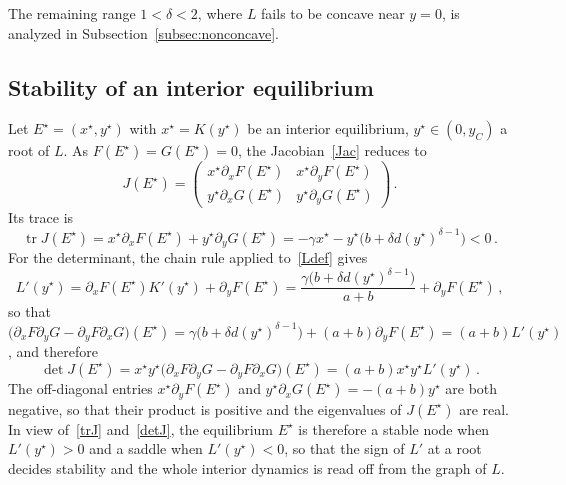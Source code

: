 \documentclass[reqno,11pt]{amsart}
\numberwithin{equation}{section}
\begin{document}
The remaining range $1<\delta<2$, where $L$ fails to be concave near $y=0$, is analyzed in Subsection~\ref{subsec:nonconcave}.

\smallskip

\subsection{Stability of an interior equilibrium}\label{subsec:int-stab}

Let $E^\star=(x^\star,y^\star)$ with $x^\star=K(y^\star)$ be an interior equilibrium, $y^\star\in(0,y_C)$ a root of $L$. As $F(E^\star)=G(E^\star)=0$, the Jacobian~\eqref{Jac} reduces to
\begin{equation}\label{eq:Jacobi_iE}
J(E^\star)=\begin{pmatrix} x^\star\partial_xF(E^\star) & x^\star\partial_yF(E^\star)\\[3pt] y^\star\partial_xG(E^\star) & y^\star\partial_yG(E^\star)\end{pmatrix}\,.
\end{equation}
Its trace is
\begin{equation}\label{trJ}
\operatorname{tr}J(E^\star)=x^\star\partial_xF(E^\star)+y^\star\partial_yG(E^\star)=-\gamma x^\star-y^\star\big(b+\delta d(y^\star)^{\delta-1}\big)<0\,.
\end{equation}
For the determinant, the chain rule applied to~\eqref{Ldef} gives
\begin{equation}\label{Lstar}
L'(y^\star)=\partial_xF(E^\star)K'(y^\star)+\partial_yF(E^\star)=\frac{\gamma\big(b+\delta d(y^\star)^{\delta-1}\big)}{a+b}+\partial_yF(E^\star)\,,
\end{equation}
so that $\big(\partial_xF\partial_yG-\partial_yF\partial_xG\big)(E^\star)=\gamma\big(b+\delta d(y^\star)^{\delta-1}\big)+(a+b)\partial_yF(E^\star)=(a+b)L'(y^\star)$, and therefore
\begin{equation}\label{detJ}
\det J(E^\star)=x^\star y^\star\big(\partial_xF\partial_yG-\partial_yF\partial_xG\big)(E^\star)=(a+b)x^\star y^\star L'(y^\star)\,.
\end{equation}
The off-diagonal entries $x^{\star}\partial_yF(E^\star)$ and $y^\star\partial_xG(E^\star)=-(a+b)y^\star$ are both negative, so that their product is positive and the eigenvalues of $J(E^\star)$ are real. In view of~\eqref{trJ} and~\eqref{detJ}, the equilibrium $E^\star$ is therefore a stable node when $L'(y^\star)>0$ and a saddle when $L'(y^\star)<0$, so that the sign of $L'$ at a root decides stability and the whole interior dynamics is read off from the graph of $L$.
\end{document}
